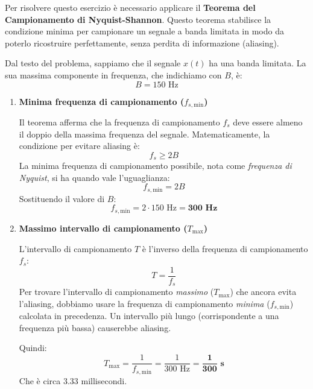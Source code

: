 
\begin{soluzione}{3}
    Per risolvere questo esercizio è necessario applicare il \textbf{Teorema del Campionamento di Nyquist-Shannon}. Questo teorema stabilisce la condizione minima per campionare un segnale a banda limitata in modo da poterlo ricostruire perfettamente, senza perdita di informazione (aliasing).

    Dal testo del problema, sappiamo che il segnale $x(t)$ ha una banda limitata. La sua massima componente in frequenza, che indichiamo con $B$, è:
    \[
        B = 150 \text{ Hz}
    \]

    \begin{enumerate}
        \item \textbf{Minima frequenza di campionamento ($f_{s, \text{min}}$)}
        
        Il teorema afferma che la frequenza di campionamento $f_s$ deve essere almeno il doppio della massima frequenza del segnale. Matematicamente, la condizione per evitare aliasing è:
        \[
            f_s \ge 2B
        \]
        La minima frequenza di campionamento possibile, nota come \textit{frequenza di Nyquist}, si ha quando vale l'uguaglianza:
        \[
            f_{s, \text{min}} = 2B
        \]
        Sostituendo il valore di $B$:
        \[
            f_{s, \text{min}} = 2 \cdot 150 \text{ Hz} = \mathbf{300 \text{ Hz}}
        \]
        
        \item \textbf{Massimo intervallo di campionamento ($T_{\text{max}}$)}
        
        L'intervallo di campionamento $T$ è l'inverso della frequenza di campionamento $f_s$:
        \[
            T = \frac{1}{f_s}
        \]
        Per trovare l'intervallo di campionamento \textit{massimo} ($T_{\text{max}}$) che ancora evita l'aliasing, dobbiamo usare la frequenza di campionamento \textit{minima} ($f_{s, \text{min}}$) calcolata in precedenza. Un intervallo più lungo (corrispondente a una frequenza più bassa) causerebbe aliasing.
        
        Quindi:
        \[
            T_{\text{max}} = \frac{1}{f_{s, \text{min}}} = \frac{1}{300 \text{ Hz}} = \mathbf{\frac{1}{300} \text{ s}}
        \]
        Che è circa $3.33$ millisecondi.

    \end{enumerate}
\end{soluzione}